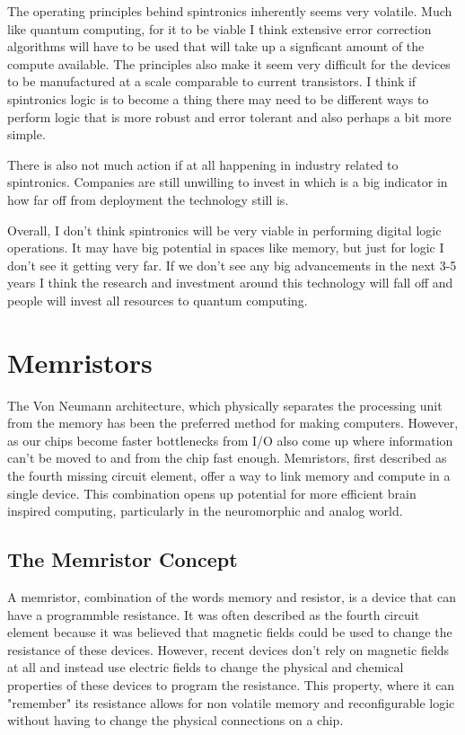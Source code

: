 \documentclass[sigconf]{acmart}
\begin{document}
The operating principles behind spintronics inherently seems very
volatile. Much like quantum computing, for it to be viable I think 
extensive error correction algorithms will have to be used that will 
take up a signficant amount of the compute available. The principles 
also make it seem very difficult for the devices to be manufactured at 
a scale comparable to current transistors. I think if spintronics 
logic is to become a thing there may need to be different ways to 
perform logic that is more robust and error tolerant and also perhaps 
a bit more simple. 

There is also not much action if at all happening in industry 
related to spintronics. Companies are still unwilling to invest 
in which is a big indicator in how far off from deployment the 
technology still is. 

Overall, I don't think spintronics will be very viable in performing 
digital logic operations. It may have big potential in spaces like 
memory, but just for logic I don't see it getting very far. If we don't 
see any big advancements in the next 3-5 years I think the research 
and investment around this technology will fall off and people 
will invest all resources to quantum computing. 

\section{Memristors}
The Von Neumann architecture, which physically separates the processing 
unit from the memory has been the preferred method for making computers. 
However, as our chips become faster bottlenecks from I/O also come up 
where information can't be moved to and from the chip fast enough. Memristors, 
first described as the fourth missing circuit element, offer a way 
to link memory and compute in a single device. This combination opens up
potential for more efficient brain inspired computing, particularly 
in the neuromorphic and analog world. 

\subsection{The Memristor Concept}
A memristor, combination of the words memory and resistor, is a device 
that can have a programmble resistance. It was often described as 
the fourth circuit element because it was believed that magnetic fields 
could be used to change the resistance of these devices. However, recent 
devices don't rely on magnetic fields at all and instead use electric fields 
to change the physical and chemical properties of these devices to program 
the resistance. This property, where it can "remember" its resistance allows 
for non volatile memory and reconfigurable logic without having to change 
the physical connections on a chip.
\end{document}
